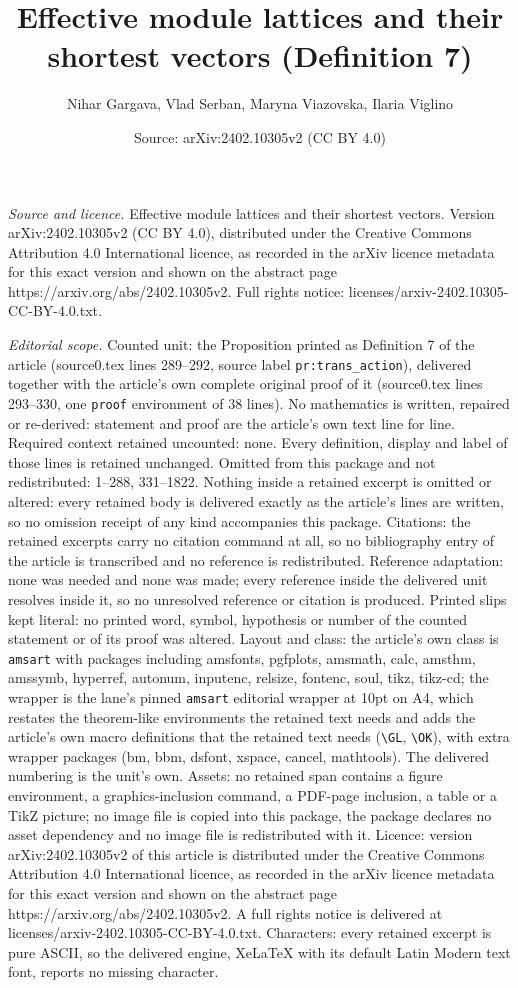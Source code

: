 \documentclass[10pt,a4paper]{amsart}
\title[Effective module lattices and their shortest vectors]{Effective module lattices and their shortest vectors (Definition 7)}
\author{Nihar Gargava, Vlad Serban, Maryna Viazovska, Ilaria Viglino}
\date{Source: arXiv:2402.10305v2 (CC BY 4.0)}
\begin{document}
\maketitle

\noindent\emph{Source and licence.} Effective module lattices and their shortest vectors. Version arXiv:2402.10305v2 (CC BY 4.0), distributed under the Creative Commons Attribution 4.0 International licence, as recorded in the arXiv licence metadata for this exact version and shown on the abstract page https://arxiv.org/abs/2402.10305v2. Full rights notice: licenses/arxiv-2402.10305-CC-BY-4.0.txt.\par\smallskip

\noindent\textit{Editorial scope.} Counted unit: the Proposition printed as Definition 7 of the article (source0.tex lines 289--292, source label \texttt{pr:trans\_action}), delivered together with the article's own complete original proof of it (source0.tex lines 293--330, one \texttt{proof} environment of 38 lines). No mathematics is written, repaired or re-derived: statement and proof are the article's own text line for line. Required context retained uncounted: none. Every definition, display and label of those lines is retained unchanged. Omitted from this package and not redistributed: 1--288, 331--1822. Nothing inside a retained excerpt is omitted or altered: every retained body is delivered exactly as the article's lines are written, so no omission receipt of any kind accompanies this package. Citations: the retained excerpts carry no citation command at all, so no bibliography entry of the article is transcribed and no reference is redistributed. Reference adaptation: none was needed and none was made; every reference inside the delivered unit resolves inside it, so no unresolved reference or citation is produced. Printed slips kept literal: no printed word, symbol, hypothesis or number of the counted statement or of its proof was altered. Layout and class: the article's own class is \texttt{amsart} with packages including amsfonts, pgfplots, amsmath, calc, amsthm, amssymb, hyperref, autonum, inputenc, relsize, fontenc, soul, tikz, tikz-cd; the wrapper is the lane's pinned \texttt{amsart} editorial wrapper at 10pt on A4, which restates the theorem-like environments the retained text needs and adds the article's own macro definitions that the retained text needs (\texttt{\textbackslash GL}, \texttt{\textbackslash OK}), with extra wrapper packages (bm, bbm, dsfont, xspace, cancel, mathtools). The delivered numbering is the unit's own. Assets: no retained span contains a figure environment, a graphics-inclusion command, a PDF-page inclusion, a table or a TikZ picture; no image file is copied into this package, the package declares no asset dependency and no image file is redistributed with it. Licence: version arXiv:2402.10305v2 of this article is distributed under the Creative Commons Attribution 4.0 International licence, as recorded in the arXiv licence metadata for this exact version and shown on the abstract page https://arxiv.org/abs/2402.10305v2. A full rights notice is delivered at licenses/arxiv-2402.10305-CC-BY-4.0.txt. Characters: every retained excerpt is pure ASCII, so the delivered engine, XeLaTeX with its default Latin Modern text font, reports no missing character.
\end{document}

